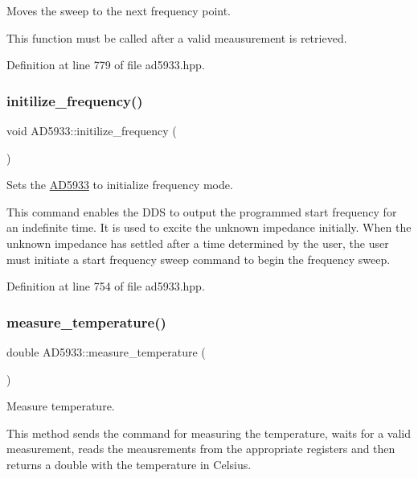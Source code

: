 Moves the sweep to the next frequency point. 

This function must be called after a valid meausurement is retrieved. 

Definition at line 779 of file ad5933.\+hpp.

\mbox{\label{struct_a_d5933_a622c24c6cae2aa2e0079fcd17e2e2453}} 
\subsubsection{\texorpdfstring{initilize\+\_\+frequency()}{initilize\_frequency()}}
{\footnotesize\ttfamily void A\+D5933\+::initilize\+\_\+frequency (\begin{DoxyParamCaption}{ }\end{DoxyParamCaption})}



Sets the \mbox{\hyperlink{struct_a_d5933}{A\+D5933}} to initialize frequency mode. 

This command enables the D\+DS to output the programmed start frequency for an indefinite time. It is used to excite the unknown impedance initially. When the unknown impedance has settled after a time determined by the user, the user must initiate a start frequency sweep command to begin the frequency sweep. 

Definition at line 754 of file ad5933.\+hpp.

\mbox{\label{struct_a_d5933_a4c95f1c1a29a826ca747378cc4e084ae}} 
\subsubsection{\texorpdfstring{measure\+\_\+temperature()}{measure\_temperature()}}
{\footnotesize\ttfamily double A\+D5933\+::measure\+\_\+temperature (\begin{DoxyParamCaption}{ }\end{DoxyParamCaption})}



Measure temperature. 

This method sends the command for measuring the temperature, waits for a valid measurement, reads the meausrements from the appropriate registers and then returns a double with the temperature in Celsius. 

